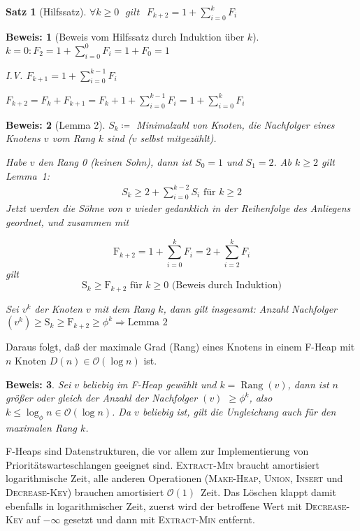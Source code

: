 \documentclass[ngerman,draft,parskip=half*,twoside]{scrreprt}
\theoremstyle{break}
\newtheorem{satz}{Satz}[chapter]
\theoremstyle{nonumberbreak}
\newtheorem{beweis}{Beweis:}
\newcommand*{\OO}{\mathcal{O}}      %
\DeclareMathOperator{\rg}{Rang}     %
\begin{document}
\begin{satz}[Hilfssatz]
$\forall k \geq 0 \mbox{ }gilt \mbox{ } F_{k+2}=1+\sum_{i=0}^k F_i$
\end{satz}

\begin{beweis}[Beweis vom Hilfssatz durch Induktion über $k$]
$k=0 : F_2=1+\sum_{i=0}^0 F_i = 1+ F_0 =1$

 I.V. $F_{k+1}=1+\sum_{i=0}^{k-1} F_i$

 $F_{k+2}=F_{k}+F_{k+1}=F_k + 1 + \sum_{i=0}^{k-1} F_i = 1+\sum_{i=0}^k F_i$
\end{beweis}

\begin{beweis}[Lemma 2]
$S_k\coloneqq$ Minimalzahl von Knoten, die Nachfolger eines Knotens $v$ vom Rang $k$ sind ($v$ selbst mitgezählt).

Habe $v$ den Rang 0 (keinen Sohn), dann ist $S_0=1$ und $S_1=2$. Ab
$k\geq2$ gilt Lemma~1:
\begin{gather*}
  S_k \geq 2 + \sum_{i=0}^{k-2} S_i \text{ für }k \geq 2
\end{gather*}
Jetzt werden die Söhne von $v$ wieder gedanklich in der Reihenfolge des Anliegens geordnet, und zusammen mit

\[\mbox{F}_{k+2}=1+\sum_{i=0}^k F_i=2+\sum_{i=2}^k F_i\] gilt \[\mbox{S}_k \geq \mbox{F}_{k+2} \mbox{ für } k \geq 0
\mbox{ (Beweis durch Induktion)}\]

Sei $v^k$ der Knoten $v$ mit dem Rang $k$, dann gilt insgesamt: Anzahl Nachfolger$(v^k) \geq \mbox{S}_k \geq
\mbox{F}_{k+2} \geq {\phi}^k \Rightarrow \mbox{Lemma 2}$ 
\end{beweis}
Daraus folgt, daß der maximale Grad (Rang) eines Knotens in einem F-Heap mit $n$ Knoten $D(n)\in\OO(\log n)$ ist.

\begin{beweis}
Sei $v$ beliebig im F-Heap gewählt und $k=\rg(v)$, dann ist $n$ größer
oder gleich der Anzahl der Nachfolger $(v)$ $\geq {\phi}^k$, also
$k \leq \log_{\phi} n \in \OO(\log n)$. Da $v$ beliebig ist, gilt die Ungleichung auch für den maximalen Rang
$k$. 
\end{beweis}
F-Heaps sind Datenstrukturen, die vor allem zur Implementierung von Prioritätswarteschlangen geeignet sind.
\textsc{Extract-Min} braucht amortisiert logarithmische Zeit, alle anderen Operationen (\textsc{Make-Heap},
\textsc{Union}, \textsc{Insert} und \textsc{Decrease-Key}) brauchen amortisiert $\OO(1)$~Zeit. Das Löschen klappt damit
ebenfalls in logarithmischer Zeit, zuerst wird der betroffene Wert mit \textsc{Decrease-Key} auf $- \infty$ gesetzt
und dann mit \textsc{Extract-Min} entfernt.
\end{document}
